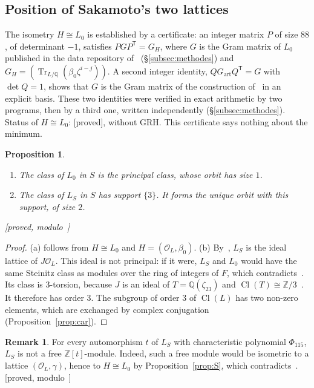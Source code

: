 \documentclass[11pt,a4paper]{amsart}
\theoremstyle{plain}
\newtheorem{proposition}[theorem]{Proposition}
\theoremstyle{definition}
\newtheorem{remark}[theorem]{Remark}
\numberwithin{equation}{section}
\newcommand{\Q}{\mathbb{Q}}
\newcommand{\Z}{\mathbb{Z}}
\newcommand{\OO}{\mathcal{O}}
\DeclareMathOperator{\Tr}{Tr}
\DeclareMathOperator{\Cl}{Cl}
\newcommand{\Lz}{L_{0}}
\newcommand{\LS}{L_{S}}
\newcommand{\st}[1]{\textup{\textsf{\small[#1]}}}
\newcommand{\DEM}{\st{proved}}
\begin{document}
\subsection{Position of Sakamoto's two lattices}\label{subsec:sakamoto}

The isometry $H\cong\Lz$ is established by a certificate: an integer matrix $P$ of size $88$, of determinant $-1$, satisfies $PGP^{\mathsf T}=G_H$, where $G$ is the Gram matrix of $\Lz$ published in the data repository of~\cite{Sak26} (\S\ref{subsec:methodes}) and $G_H=(\Tr_{L/\Q}(\beta_0\zeta^{i-j}))$. A second integer identity, $QG_{\mathrm{art}}Q^{\mathsf T}=G$ with $\det Q=1$, shows that $G$ is the Gram matrix of the construction of~\cite[\S5.4]{Sak26} in an explicit basis. These two identities were verified in exact arithmetic by two programs, then by a third one, written independently (\S\ref{subsec:methodes}). Status of $H\cong\Lz$: \DEM, without GRH. This certificate says nothing about the minimum.

\begin{proposition}\label{prop:L0LS}
\begin{enumerate}[label=\textup{(\alph*)}]
\item The class of $\Lz$ in $S$ is the principal class, whose orbit has size $1$.
\item The class of $\LS$ in $S$ has support $\{3\}$. It forms the unique orbit with this support, of size $2$.
\end{enumerate}
\st{proved, modulo~\cite[Rem.~3.11 and Lemma~A.9]{Sak26}}
\end{proposition}

\begin{proof}
(a) follows from $H\cong\Lz$ and $H=(\OO_L,\beta_0)$.
(b) By~\cite[Rem.~3.11]{Sak26}, $\LS$ is the ideal lattice of $J\OO_L$. This ideal is not principal: if it were, $\LS$ and $\Lz$ would have the same Steinitz class as modules over the ring of integers of $F$, which contradicts~\cite[Lemma~A.9]{Sak26}. Its class is $3$-torsion, because $J$ is an ideal of $T=\Q(\zeta_{23})$ and $\Cl(T)\cong\Z/3$~\cite{Sak26}. It therefore has order $3$. The subgroup of order $3$ of $\Cl(L)$ has two non-zero elements, which are exchanged by complex conjugation (Proposition~\ref{prop:car}).
\end{proof}

\begin{remark}\label{rem:nonlibre}
For every automorphism $t$ of $\LS$ with characteristic polynomial $\Phi_{115}$, $\LS$ is not a free $\Z[t]$-module. Indeed, such a free module would be isometric to a lattice $(\OO_L,\gamma)$, hence to $H\cong\Lz$ by Proposition~\ref{prop:S}, which contradicts~\cite[Thm.~A.10]{Sak26}. \st{proved, modulo~\cite[Thm.~A.10]{Sak26}}
\end{remark}
\end{document}
